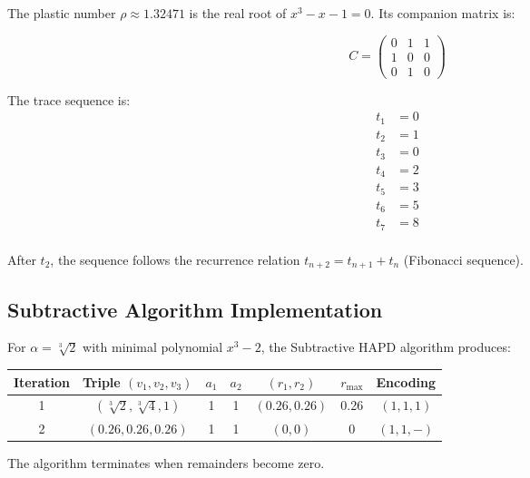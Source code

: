 \begin{example}\label{ex:matrix_plastic}
The plastic number $\rho \approx 1.32471$ is the real root of $x^3 - x - 1 = 0$. Its companion matrix is:

\begin{equation}
C = \begin{pmatrix}
0 & 1 & 1 \\
1 & 0 & 0 \\
0 & 1 & 0
\end{pmatrix}
\end{equation}

The trace sequence is:
\begin{align}
t_1 &= 0 \\
t_2 &= 1 \\
t_3 &= 0 \\
t_4 &= 2 \\
t_5 &= 3 \\
t_6 &= 5 \\
t_7 &= 8 \\
\end{align}

After $t_2$, the sequence follows the recurrence relation $t_{n+2} = t_{n+1} + t_n$ (Fibonacci sequence).
\end{example}

\subsection{Subtractive Algorithm Implementation}

\begin{example}\label{ex:subtractive_cube_root}
For $\alpha = \sqrt[3]{2}$ with minimal polynomial $x^3 - 2$, the Subtractive HAPD algorithm produces:

\begin{center}
\begin{tabular}{|c|c|c|c|c|c|c|}
\hline
Iteration & Triple $(v_1, v_2, v_3)$ & $a_1$ & $a_2$ & $(r_1, r_2)$ & $r_{\max}$ & Encoding \\
\hline
1 & $(\sqrt[3]{2}, \sqrt[3]{4}, 1)$ & 1 & 1 & $(0.26, 0.26)$ & 0.26 & $(1,1,1)$ \\
\hline
2 & $(0.26, 0.26, 0.26)$ & 1 & 1 & $(0, 0)$ & 0 & $(1,1,-)$ \\
\hline
\end{tabular}
\end{center}

The algorithm terminates when remainders become zero.
\end{example}

